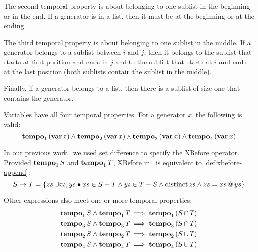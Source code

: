 \documentclass[12pt,openright,twoside,a4paper,oldfontcommands,english,brazil,draft]{abntex2}
\makeatletter
\theoremstyle{theo}
\def\varop{\ensuremath\operatorname{\mathbf{var}}}
\newcommand{\var}[1]{\ensuremath\varop #1}
\def\xbeforeop{\ensuremath\rightarrow}
\newcommand{\xbefore}[2]{\ensuremath #1 \xbeforeop #2 }
\def\Tempotext{Tempo\xspace}
\def\tempoop{\ensuremath\operatorname{\mathbf{tempo}}}
\newcommand{\tempo}[2][1-4]{\ensuremath\tempoop_{#1} #2}
\def\distinctop{\ensuremath\operatorname{distinct}}
\newcommand{\distinct}[1]{\ensuremath\distinctop #1}
\newcommand{\append}[2]{\ensuremath #1 \operatorname{\mathbf{@}} #2}
\newcommand{\parsin}[1]{\ensuremath\left( #1 \right)}
\def\union{\ensuremath\operatorname{\cup}}
\def\inter{\ensuremath\operatorname{\cap}}
\makeatother
\begin{document}
The second temporal property is about belonging to one sublist in the beginning or in the end.
If a generator is in a list, then it must be at the beginning or at the ending.
%
%

The third temporal property is about belonging to one sublist in the middle.
If a generator belongs to a sublist between $i$ and $j$, then it belongs to the sublist that starts at first position and ends in $j$ and to the sublist that starts at $i$ and ends at the last position (both sublists contain the sublist in the middle).
%
%

Finally, if a generator belongs to a list, then there is a sublist of size one that contains the generator.
%
%

Variables have all four temporal properties. For a generator $x$, the following is valid:
%
\[
\tempo[1]{\left(\var{x}\right)} \land
\tempo[2]{\left(\var{x}\right)} \land
\tempo[3]{\left(\var{x}\right)} \land
\tempo[4]{\left(\var{x}\right)}
\]

\begin{sloppypar}
In our previous work~\cite{DM2015} we used set difference to specify the XBefore operator.
Provided $\tempo[1]{S}$ and $\tempo[1]{T}$, XBefore in~\cite{DM2015} is equivalent to \eqref{def:xbefore-append}:
%
\begin{equation}
\xbefore{S}{T} = \left\{ zs | \exists xs, ys \bullet xs \in S-T \land ys \in T-S \land \distinct{zs} \land zs = \append{xs}{ys}  \right\}
\end{equation}
\end{sloppypar}

Other expressions also meet one or more temporal properties:
\begin{subequations}
\begin{align}
\tempo[1]{S} \land \tempo[1]{T} & \implies \tempo[1]{\parsin{S \inter T}}\\
\tempo[3]{S} \land \tempo[3]{T} & \implies \tempo[3]{\parsin{S \inter T}}\\
\tempo[2]{S} \land \tempo[2]{T} & \implies \tempo[2]{\parsin{S \union T}}\\
\tempo[4]{S} \land \tempo[4]{T} & \implies \tempo[4]{\parsin{S \union T}}
\end{align}
\end{subequations}
\end{document}
